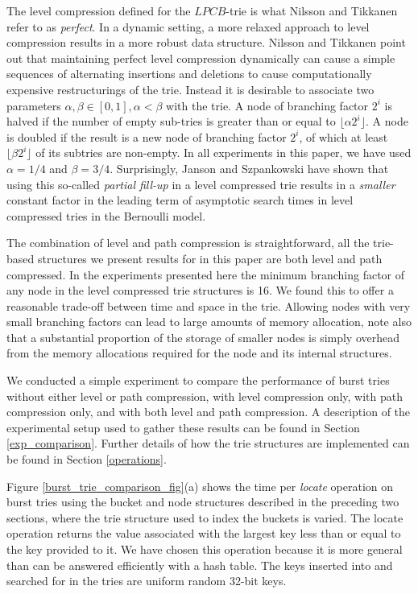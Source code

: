 \documentclass[]{acmtrans2m}
\begin{document}
The level compression defined for the $LPCB$-trie is what Nilsson and Tikkanen \citeyear{NilssonTikkanen02} refer to as \textit{perfect}.
In a dynamic setting, a more relaxed approach to level compression results in a more robust data structure.
Nilsson and Tikkanen point out that maintaining perfect level compression dynamically can cause a simple sequences of alternating insertions and deletions to cause 
computationally expensive restructurings of the trie. Instead it is desirable to associate two parameters $\alpha, \beta \in [0, 1], \alpha < \beta$ with the trie. 
A node of branching factor $2^i$ is halved if the number of empty sub-tries is greater than or equal to $\lfloor \alpha 2^i \rfloor $.
A node is doubled if the result is a new node of branching factor $2^i$, of which at least $\lfloor \beta 2^i \rfloor$ of its subtries are non-empty.
In all experiments in this paper, we have used $\alpha = 1/4$ and $\beta = 3/4$. Surprisingly, Janson and Szpankowski \citeyear{JansonSzpankowski07} have shown that using this so-called
\textit{partial fill-up} in a level compressed trie results in a \textit{smaller} constant factor in the leading term of asymptotic search times in level compressed tries in the Bernoulli model. 

The combination of level and path compression is straightforward, all the trie-based structures we present results for in this paper
are both level and path compressed. In the experiments presented here the minimum branching factor of any node in the level
compressed trie structures is 16. We found this to offer a reasonable trade-off between time and space in the trie. Allowing
nodes with very small branching factors can lead to large amounts of memory allocation, note also that a substantial proportion of
the storage of smaller nodes is simply overhead from the memory allocations required for the node and its internal structures.

We conducted a simple experiment to compare the performance of burst tries without either level or path compression, with level compression only, with path compression only,
and with both level and path compression. A description of the experimental setup used to gather these results can be found in Section \ref{exp_comparison}. Further details of how the
trie structures are implemented can be found in Section \ref{operations}.

Figure \ref{burst_trie_comparison_fig}(a) shows the time per \textit{locate} operation on burst tries using the bucket and node structures described in the preceding two sections,
where the trie structure used to index the buckets is varied. The locate operation returns the value associated with the largest key less than or equal to the key provided to it.
We have chosen this operation because it is more general than can be answered efficiently with a hash table. 
The keys inserted into and searched for in the tries are uniform random 32-bit keys.
\end{document}
